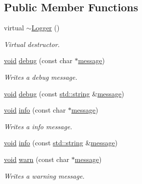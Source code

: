 \subsection*{Public Member Functions}
\begin{DoxyCompactItemize}
\item 
virtual \hyperlink{class_assimp_1_1_logger_a27dd2bd4fd3b9cde0635ed22aad687c3}{$\sim$\-Logger} ()
\begin{DoxyCompactList}\small\item\em Virtual destructor. \end{DoxyCompactList}\item 
\hyperlink{_s_d_l__opengl_8h_a3db05964a3cc4410f35b7ea2b7eb850d}{void} \hyperlink{class_assimp_1_1_logger_a3b10454ab4c0949f251062376d9c4161}{debug} (const char $\ast$\hyperlink{_g_l_e_w_2glew_8h_ab5d4c2bfcb78f279c688575297d42f74}{message})
\begin{DoxyCompactList}\small\item\em Writes a debug message. \end{DoxyCompactList}\item 
\hyperlink{_s_d_l__opengl_8h_a3db05964a3cc4410f35b7ea2b7eb850d}{void} \hyperlink{class_assimp_1_1_logger_af978b5a592fef74ec3b5634ebdf22a3b}{debug} (const \hyperlink{_s_d_l__opengl_8h_a4643b88e2349494c65861169f8944eca}{std\-::string} \&\hyperlink{_g_l_e_w_2glew_8h_ab5d4c2bfcb78f279c688575297d42f74}{message})
\item 
\hyperlink{_s_d_l__opengl_8h_a3db05964a3cc4410f35b7ea2b7eb850d}{void} \hyperlink{class_assimp_1_1_logger_a12b8a125083c47ac0bb6056f00761e52}{info} (const char $\ast$\hyperlink{_g_l_e_w_2glew_8h_ab5d4c2bfcb78f279c688575297d42f74}{message})
\begin{DoxyCompactList}\small\item\em Writes a info message. \end{DoxyCompactList}\item 
\hyperlink{_s_d_l__opengl_8h_a3db05964a3cc4410f35b7ea2b7eb850d}{void} \hyperlink{class_assimp_1_1_logger_a6774f0cc4373195ef899799a40ad9879}{info} (const \hyperlink{_s_d_l__opengl_8h_a4643b88e2349494c65861169f8944eca}{std\-::string} \&\hyperlink{_g_l_e_w_2glew_8h_ab5d4c2bfcb78f279c688575297d42f74}{message})
\item 
\hyperlink{_s_d_l__opengl_8h_a3db05964a3cc4410f35b7ea2b7eb850d}{void} \hyperlink{class_assimp_1_1_logger_a32bc5ee4b23df13551b83b925907f1b1}{warn} (const char $\ast$\hyperlink{_g_l_e_w_2glew_8h_ab5d4c2bfcb78f279c688575297d42f74}{message})
\begin{DoxyCompactList}\small\item\em Writes a warning message. \end{DoxyCompactList}\item 

\end{DoxyCompactItemize}
